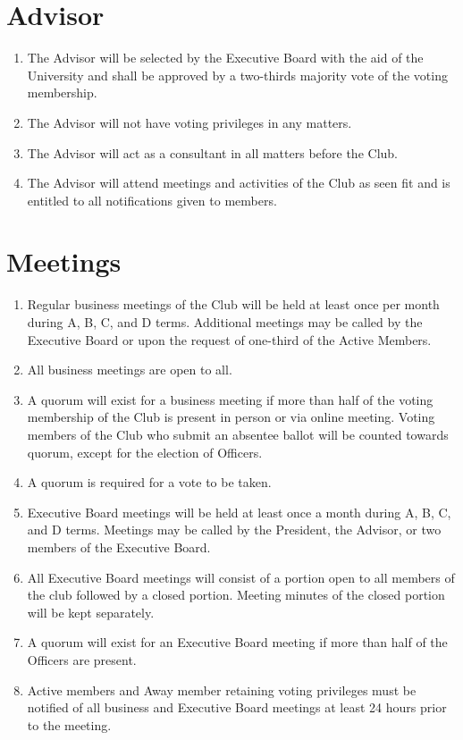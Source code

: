 \documentclass[12pt,letterpaper,oneside]{book}
\begin{document}
\chapter{Advisor}

\begin{enumerate}

\item The Advisor will be selected by the Executive Board with the aid of the University and shall be approved by a two-thirds majority vote of the voting membership.
\item The Advisor will not have voting privileges in any matters.
\item The Advisor will act as a consultant in all matters before the Club.
\item The Advisor will attend meetings and activities of the Club as seen fit and is entitled to all notifications given to members.

\end{enumerate}

\chapter{Meetings} \label{chap:meetings}

\begin{enumerate}

\item Regular business meetings of the Club will be held at least once per month during A, B, C, and D terms. Additional meetings may be called by the Executive Board or upon the request of one-third of the Active Members.
\item All business meetings are open to all.
\item A quorum will exist for a business meeting if more than half of the voting
    membership of the Club is present in person or via online meeting. Voting
    members of the Club who submit an absentee ballot will be counted towards
    quorum, except for the election of Officers.
\item A quorum is required for a vote to be taken.
\item Executive Board meetings will be held at least once a month during A, B, C, and D terms. Meetings may be called by the President, the Advisor, or two members of the Executive Board.
\item \label{itm:closedmeetings} All Executive Board meetings will consist of a portion open to all members of the club followed by a closed portion. Meeting minutes of the closed portion will be kept separately.
\item A quorum will exist for an Executive Board meeting if more than half of the Officers are present.
\item Active members and Away member retaining voting privileges must be notified of all business and Executive Board meetings at least 24 hours prior to the meeting.

\end{enumerate}
\end{document}
